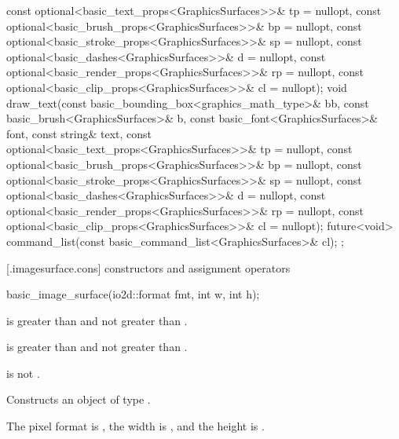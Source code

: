 \begin{codeblock}
{{      const optional<basic_text_props<GraphicsSurfaces>>& tp = nullopt,
      const optional<basic_brush_props<GraphicsSurfaces>>& bp = nullopt,
      const optional<basic_stroke_props<GraphicsSurfaces>>& sp = nullopt,
      const optional<basic_dashes<GraphicsSurfaces>>& d = nullopt,
      const optional<basic_render_props<GraphicsSurfaces>>& rp = nullopt,
      const optional<basic_clip_props<GraphicsSurfaces>>& cl = nullopt);
    void draw_text(const basic_bounding_box<graphics_math_type>& bb,
      const basic_brush<GraphicsSurfaces>& b,
      const basic_font<GraphicsSurfaces>& font, const string& text,
      const optional<basic_text_props<GraphicsSurfaces>>& tp = nullopt,
      const optional<basic_brush_props<GraphicsSurfaces>>& bp = nullopt,
      const optional<basic_stroke_props<GraphicsSurfaces>>& sp = nullopt,
      const optional<basic_dashes<GraphicsSurfaces>>& d = nullopt,
      const optional<basic_render_props<GraphicsSurfaces>>& rp = nullopt,
      const optional<basic_clip_props<GraphicsSurfaces>>& cl = nullopt);
	future<void> command_list(const basic_command_list<GraphicsSurfaces>& cl);
  };
}
\end{codeblock}

 [\iotwod.imagesurface.cons] { constructors and assignment operators}

%
\begin{itemdecl}
basic_image_surface(io2d::format fmt, int w, int h);
\end{itemdecl}
\begin{itemdescr}
\pnum
\requires
{} is greater than  and not greater than .

\pnum
{} is greater than  and not greater than .

\pnum
{} is not .

\pnum
\effects
Constructs an object of type .

\pnum
The pixel format is , the width is , and the height is .
\end{itemdescr}

